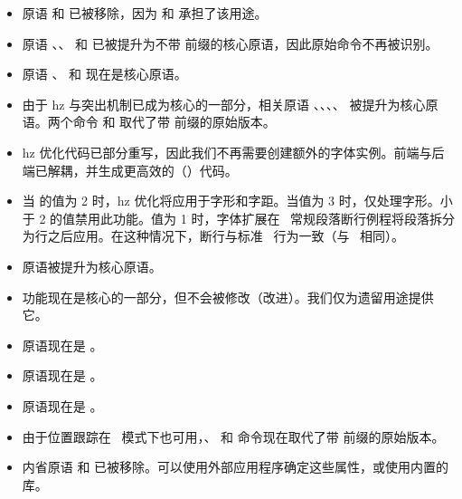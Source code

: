 \begin{itemize}
\item 原语  和  已被移除，因为  和  承担了该用途。

\item 原语 、、 和  已被提升为不带  前缀的核心原语，因此原始命令不再被识别。

\item 原语 、 和  现在是核心原语。

\item 由于 hz 与突出机制已成为核心的一部分，相关原语 、、、、 被提升为核心原语。两个命令  和  取代了带 \type {\pdf} 前缀的原始版本。

\item hz 优化代码已部分重写，因此我们不再需要创建额外的字体实例。前端与后端已解耦，并生成更高效的（\PDF）代码。

\item 当  的值为 2 时，hz 优化将应用于字形和字距。当值为 3 时，仅处理字形。小于 2 的值禁用此功能。值为 1 时，字体扩展在 \TEX\ 常规段落断行例程将段落拆分为行之后应用。在这种情况下，断行与标准 \TEX\ 行为一致（与 \PDFTEX\ 相同）。

\item {} 原语被提升为核心原语。

\item {} 功能现在是核心的一部分，但不会被修改（改进）。我们仅为遗留用途提供它。

\item {} 原语现在是 。

\item {} 原语现在是 。

\item {} 原语现在是 。

\item 由于位置跟踪在 \DVI\ 模式下也可用，、 和  命令现在取代了带  前缀的原始版本。

\item 内省原语 \type {\pdflastximagecolordepth} 和 \type {\pdfximagebbox} 已被移除。可以使用外部应用程序确定这些属性，或使用内置的  库。


\end{itemize}
